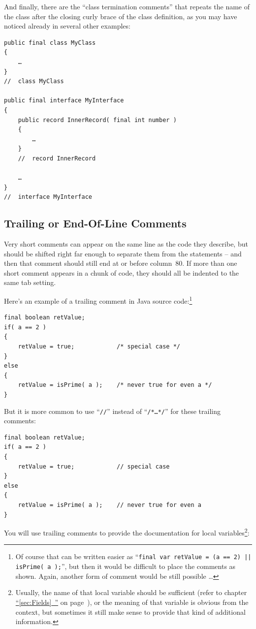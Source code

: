 \documentclass[11pt,a4paper, titlepage, parskip=half, headsepline, footsepline, cleardoublepage=current, headheight=1cm]{scrbook}
\newcommand*{\tqfullvref}[1]{\hyperref[{#1}]{“\ref*{#1}~\nameref*{#1}”} on page~\pageref{#1}}
\begin{document}
And finally, there are the “class termination comments” that repeats the name of the class after the closing curly brace of the class definition, as you may have noticed already in several other examples:
\begin{lstlisting}
public final class MyClass
{
    …
}
//  class MyClass

public final interface MyInterface
{
    public record InnerRecord( final int number )
    {
        …
    }
    //  record InnerRecord
    
    …
}
//  interface MyInterface
\end{lstlisting}


\subsection{Trailing or End-Of-Line Comments}\label{sec:TrailingOrEndOfLineComments}
Very short comments can appear on the same line as the code they describe, but should be shifted right far enough to separate them from the statements – and then that comment should still end at or before column~80. If more than one short comment appears in a chunk of code, they should all be indented to the same tab setting.

Here's an example of a trailing comment in Java source code:\footnote{Of course that can be written easier as “\lstinline!final var retValue = (a == 2) || isPrime( a );!”, but then it would be difficult to place the comments as shown. Again, another form of comment would be still possible …}
\begin{lstlisting}
final boolean retValue;
if( a == 2 )
{
    retValue = true;            /* special case */
}
else
{
    retValue = isPrime( a );    /* never true for even a */
}
\end{lstlisting}

But it is more common to use “\verb#//#” instead of “\verb#/*…*/#” for these trailing comments:
\begin{lstlisting}
final boolean retValue;
if( a == 2 )
{
    retValue = true;            // special case
}
else
{
    retValue = isPrime( a );    // never true for even a
}
\end{lstlisting}

You will use trailing comments to provide the documentation for local variables\footnote{Usually, the name of that local variable should be sufficient (refer to chapter \tqfullvref{sec:Fields}), or the meaning of that variable is obvious from the context, but sometimes it still make sense to provide that kind of additional information.}:
\end{document}
